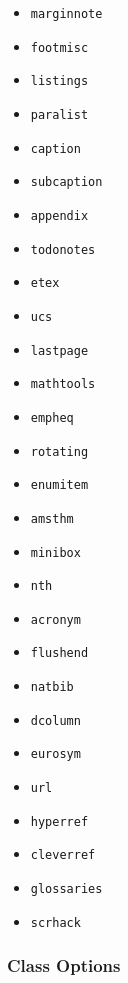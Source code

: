 \begin{itemize}
    \item \lstinline!marginnote!
    \item \lstinline!footmisc!
    \item \lstinline!listings!
    \item \lstinline!paralist!
    \item \lstinline!caption!
    \item \lstinline!subcaption!
    \item \lstinline!appendix!
    \item \lstinline!todonotes!
    \item \lstinline!etex!
    \item \lstinline!ucs!
    \item \lstinline!lastpage!
    \item \lstinline!mathtools!
    \item \lstinline!empheq!
    \item \lstinline!rotating!
    \item \lstinline!enumitem!
    \item \lstinline!amsthm!
    \item \lstinline!minibox!
    \item \lstinline!nth!
    \item \lstinline!acronym!
    \item \lstinline!flushend!
    \item \lstinline!natbib!
    \item \lstinline!dcolumn!
    \item \lstinline!eurosym!
    \item \lstinline!url!
    \item \lstinline!hyperref!
    \item \lstinline!cleverref!
    \item \lstinline!glossaries!
    \item \lstinline!scrhack!
\end{itemize}


\subsubsection{Class Options}

